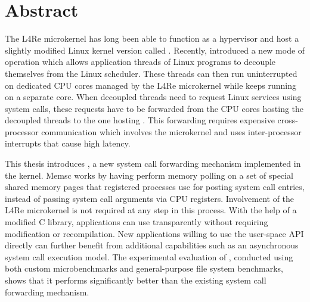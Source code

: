 \chapter*{\centering Abstract}

The L4Re microkernel has long been able to function as a hypervisor and host a
slightly modified Linux kernel version called \llinux. Recently, \llinux
introduced a new mode of operation which allows application threads of Linux
programs to decouple themselves from the Linux scheduler. These threads can
then run uninterrupted on dedicated CPU cores managed by the L4Re microkernel
while \llinux keeps running on a separate core. When decoupled threads need to
request Linux services using system calls, these requests have to be forwarded
from the CPU cores hosting the decoupled threads to the one hosting \llinux.
This forwarding requires expensive cross-processor communication which involves
the microkernel and uses inter-processor interrupts that cause high latency.

This thesis introduces \memsc, a new system call forwarding mechanism
implemented in the \llinux kernel. Memsc works by having \llinux perform memory
polling on a set of special shared memory pages that registered processes use
for posting system call entries, instead of passing system call arguments via
CPU registers. Involvement of the L4Re microkernel is not required at any step
in this process. With the help of a modified C library, applications can use
\memsc transparently without requiring modification or recompilation. New
applications willing to use the user-space API directly can further benefit
from additional capabilities such as an asynchronous system call execution
model. The experimental evaluation of \memsc, conducted using both custom
microbenchmarks and general-purpose file system benchmarks, shows that it
performs significantly better than the existing \llinux system call forwarding
mechanism.
